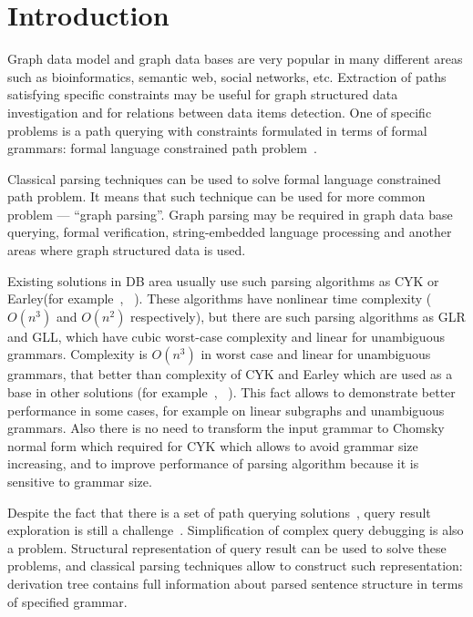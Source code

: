 \documentclass{sig-alternate} %
\begin{document}
\section{Introduction}
Graph data model and graph data bases are very popular in many different areas such as bioinformatics, semantic web, social networks, etc.
Extraction of paths satisfying specific constraints may be useful for graph structured data investigation and for relations between data items detection.
One of specific problems is a path querying with constraints formulated in terms of formal grammars: formal language constrained path problem~\cite{FLCpathProblem}.


Classical parsing techniques can be used to solve formal language constrained path problem. 
It means that such technique can be used for more common problem --- ``graph parsing''. 
Graph parsing may be required in graph data base querying, formal verification, string-embedded language processing and another areas where graph structured data is used. 

Existing solutions in DB area usually use such parsing algorithms as CYK or Earley(for example~\cite{ConjCFPathQuery}, ~\cite{GraphQueryWithEarley}). These algorithms have nonlinear time complexity ($O(n^3)$ and $O(n^2)$ respectively), but there are such parsing algorithms as GLR and GLL, which have cubic worst-case complexity and linear for unambiguous grammars.  
Complexity is $O(n^3)$ in worst case and linear for unambiguous grammars, that better than complexity of CYK and Earley which are used as a base in other solutions (for example~\cite{ConjCFPathQuery}, ~\cite{GraphQueryWithEarley}).
This fact allows to demonstrate better performance in some cases, for example on linear subgraphs and unambiguous grammars. 
Also there is no need to transform the input grammar to Chomsky normal form which required for CYK which allows to avoid grammar size increasing, and to improve performance of parsing algorithm because it is sensitive to grammar size.

Despite the fact that there is a set of path querying solutions~\cite{GraphQueryWithEarley, ConjCFPathQuery, !!!}, query result exploration is still a challenge~\cite{hofman2015separabilityForRegQueryDebugging}. 
Simplification of complex query debugging is also a problem.
Structural representation of query result can be used to solve these problems, and classical parsing techniques allow to construct such representation: derivation tree contains full information about parsed sentence structure in terms of specified grammar.
\end{document}
